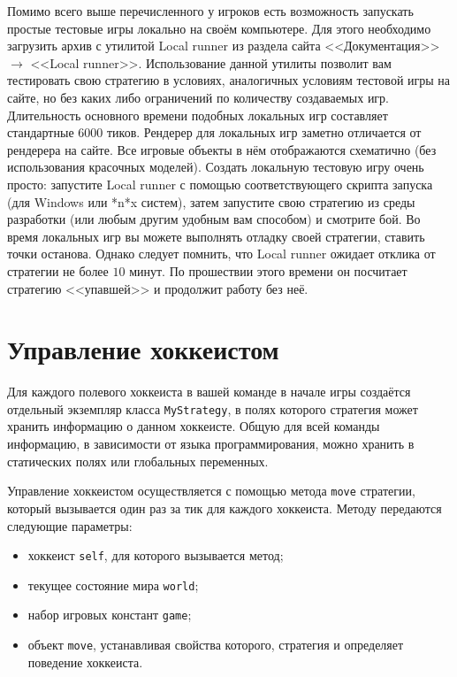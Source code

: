 Помимо всего выше перечисленного у игроков есть возможность запускать простые тестовые игры локально на своём компьютере. Для этого
необходимо загрузить архив с утилитой Local runner из раздела сайта <<Документация>> $\rightarrow$ <<Local runner>>. Использование данной
утилиты позволит вам тестировать свою стратегию в условиях, аналогичных условиям тестовой игры на сайте, но без каких либо ограничений по
количеству создаваемых игр. Длительность основного времени подобных локальных игр составляет стандартные $6000$ тиков. Рендерер для
локальных игр заметно отличается от рендерера на сайте. Все игровые объекты в нём отображаются схематично (без использования красочных
моделей). Создать локальную тестовую игру очень просто: запустите Local runner с помощью соответствующего скрипта запуска (для Windows или
*n*x систем), затем запустите свою стратегию из среды разработки (или любым другим удобным вам способом) и смотрите бой. Во время локальных
игр вы можете выполнять отладку своей стратегии, ставить точки останова. Однако следует помнить, что Local runner ожидает отклика от
стратегии не более $10$ минут. По прошествии этого времени он посчитает стратегию <<упавшей>> и продолжит работу без неё.

\section{Управление хоккеистом}

Для каждого полевого хоккеиста в вашей команде в начале игры создаётся отдельный экземпляр класса \texttt{MyStrategy}, в полях которого
стратегия может хранить информацию о данном хоккеисте. Общую для всей команды информацию, в зависимости от языка программирования, можно
хранить в статических полях или глобальных переменных.

Управление хоккеистом осуществляется с помощью метода \texttt{move} стратегии, который вызывается один раз за тик для каждого хоккеиста.
Методу передаются следующие параметры:
\begin{itemize}
  \item хоккеист \texttt{self}, для которого вызывается метод;
  \item текущее состояние мира \texttt{world};
  \item набор игровых констант \texttt{game};
  \item объект \texttt{move}, устанавливая свойства которого, стратегия и определяет поведение хоккеиста.
\end{itemize}

